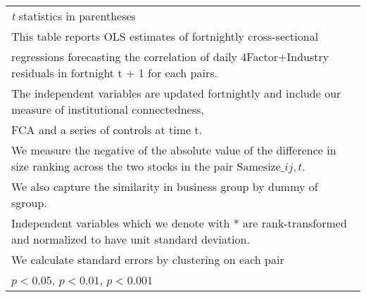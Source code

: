 {\begin{tabular}{l*{7}{c}}
\hline\hline
\multicolumn{8}{l}{\footnotesize \textit{t} statistics in parentheses}\\
\multicolumn{8}{l}{\footnotesize This table reports OLS estimates of fortnightly cross-sectional}\\
\multicolumn{8}{l}{\footnotesize  regressions forecasting the correlation of daily 4Factor+Industry residuals in fortnight t + 1 for each pairs.}\\
\multicolumn{8}{l}{\footnotesize The independent variables are updated fortnightly and include our measure of institutional connectedness,}\\
\multicolumn{8}{l}{\footnotesize  FCA and a series of controls at time t.}\\
\multicolumn{8}{l}{\footnotesize We measure the negative of the absolute value of the difference in size ranking across the two stocks in the pair $ \text{Samesize}\_{ij,t} $.}\\
\multicolumn{8}{l}{\footnotesize We also capture the similarity in business group by dummy of sgroup.}\\
\multicolumn{8}{l}{\footnotesize Independent variables which  we denote with * are rank-transformed and normalized to have unit standard deviation.}\\
\multicolumn{8}{l}{\footnotesize  We calculate standard errors by clustering on each pair}\\
\multicolumn{8}{l}{\footnotesize \sym{*} \(p<0.05\), \sym{**} \(p<0.01\), \sym{***} \(p<0.001\)}\\
\end{tabular}
}
